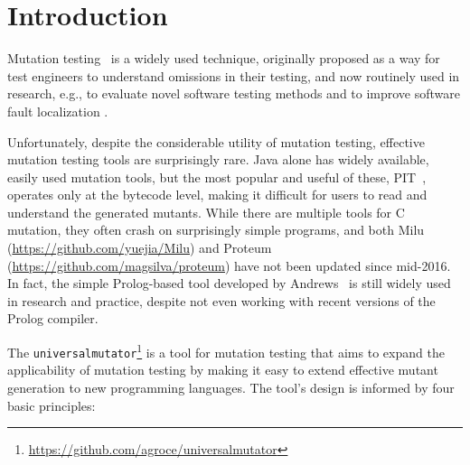 \section{Introduction}

Mutation testing~\cite{PracProg,Mut2000} is a widely used technique,
originally proposed as a way for test engineers to understand
omissions in their testing, and now routinely used in research, e.g., to evaluate
novel software testing methods \cite{ISSTA13,ahmed_testedness} and to improve software
fault localization \cite{Metallaxis,multilingual,TransProgTest}.

Unfortunately, despite the considerable utility of mutation testing,
effective mutation testing tools are surprisingly rare.  Java alone
has widely available, easily used mutation tools, but the most popular
and useful of these, PIT~\cite{pittest}, operates only at the bytecode
level, making it difficult for users to read and understand the
generated mutants.  While there are multiple tools for C mutation,
they often crash on surprisingly simple programs, and both Milu
(\url{https://github.com/yuejia/Milu}) and Proteum
(\url{https://github.com/magsilva/proteum}) have not been updated
since mid-2016.  In fact, the simple Prolog-based tool developed by
Andrews~\cite{mutant} is still widely used in research and
practice, despite not even working with recent versions of the Prolog compiler.

The {\tt universalmutator}\footnote{\url{https://github.com/agroce/universalmutator}} is a tool for
mutation testing that aims to expand the
applicability of mutation testing by making it easy to extend
effective mutant generation to new programming languages.
The tool's design is informed by four basic principles:

